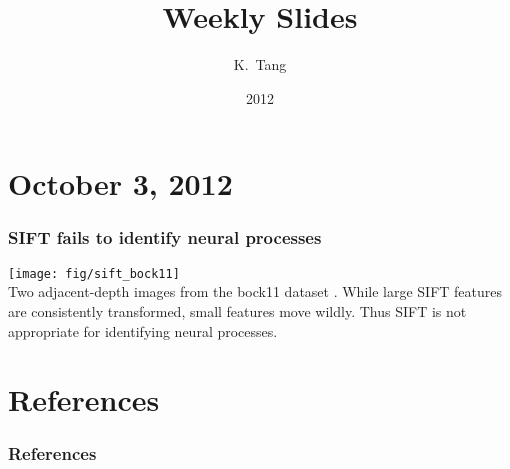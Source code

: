 \documentclass{beamer}
\title{Weekly Slides}
\author{K.~Tang\inst{1}}
\institute{
  \inst{1}
  Columbia University
}
\date{2012}
\begin{document}
\frame{\titlepage}

\section{October 3, 2012}
\begin{frame}
  \frametitle{SIFT fails to identify neural processes}
  \texttt{[image: fig/sift\_bock11]}\\
  Two adjacent-depth images from the bock11 dataset \cite{Bock2011}. While large SIFT features are consistently transformed, small features move wildly. Thus SIFT is not appropriate for identifying neural processes.
\end{frame}

\section{References}
  \begin{frame}[allowframebreaks]
  \frametitle{References}
  
  
\end{frame}
\end{document}
